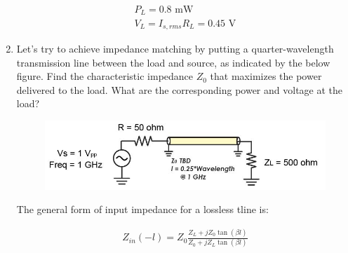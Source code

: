 \documentclass[11pt]{article}
\begin{document}
\begin{enumerate}
	\begin{align*}
		P_L = 0.8 \text{ mW} \\
		V_L = I_{s,rms} R_L = 0.45 \text{ V}
	\end{align*}
	
	\item Let's try to achieve impedance matching by putting a quarter-wavelength transmission line between the load and source, as indicated by the below figure. Find the characteristic impedance $Z_0$ that maximizes the power delivered to the load. What are the corresponding power and voltage at the load?
	
	\begin{figure}[H]
		\centering \includegraphics[width=\textwidth-6cm]{images/problem3c.jpg}
	\end{figure}

	The general form of input impedance for a lossless tline is:
	
	\begin{align*}
		Z_{in}(-l) = Z_0 \frac{Z_L + j Z_0 \tan(\beta l)}{Z_0 + j Z_L \tan(\beta l)}
	\end{align*}
\end{enumerate}
\end{document}
